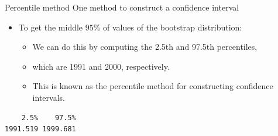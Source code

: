 \documentclass[
  ignorenonframetext,
]{beamer}
\newenvironment{Shaded}{\begin{snugshade}}{\end{snugshade}}
\newcommand{\AttributeTok}[1]{\textcolor[rgb]{0.13,0.29,0.53}{#1}}
\newcommand{\CommentTok}[1]{\textcolor[rgb]{0.56,0.35,0.01}{\textit{#1}}}
\newcommand{\ConstantTok}[1]{\textcolor[rgb]{0.56,0.35,0.01}{#1}}
\newcommand{\ControlFlowTok}[1]{\textcolor[rgb]{0.13,0.29,0.53}{\textbf{#1}}}
\newcommand{\DecValTok}[1]{\textcolor[rgb]{0.00,0.00,0.81}{#1}}
\newcommand{\FloatTok}[1]{\textcolor[rgb]{0.00,0.00,0.81}{#1}}
\newcommand{\FunctionTok}[1]{\textcolor[rgb]{0.13,0.29,0.53}{\textbf{#1}}}
\newcommand{\NormalTok}[1]{#1}
\newcommand{\OtherTok}[1]{\textcolor[rgb]{0.56,0.35,0.01}{#1}}
\newcommand{\SpecialCharTok}[1]{\textcolor[rgb]{0.81,0.36,0.00}{\textbf{#1}}}
\providecommand{\tightlist}{%
  \setlength{\itemsep}{0pt}\setlength{\parskip}{0pt}}
\begin{document}
\begin{frame}[fragile]{Percentile method}
\protect\hypertarget{percentile-method-2}{}
One method to construct a confidence interval

\begin{itemize}
\item
  To get the middle \(95\%\) of values of the bootstrap distribution:

  \begin{itemize}
  \tightlist
  \item
    We can do this by computing the 2.5th and 97.5th percentiles,
  \item
    which are 1991 and 2000, respectively.
  \item
    This is known as the percentile method for constructing confidence
    intervals.
  \end{itemize}
\end{itemize}

\small

\begin{Shaded}
\end{Shaded}

\begin{verbatim}
    2.5%    97.5% 
1991.519 1999.681 
\end{verbatim}

\normalsize
\end{frame}
\end{document}
